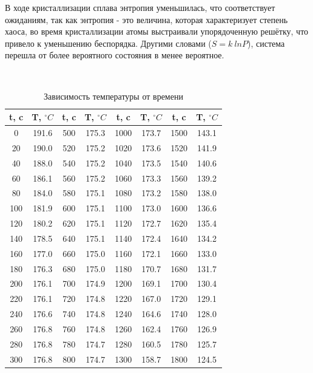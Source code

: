 \documentclass[a4paper]{scrartcl}
\begin{document}
В ходе кристаллизации сплава энтропия уменьшилась, что соответствует ожиданиям, так как энтропия - это величина, которая характеризует степень хаоса, во время кристаллизации атомы выстраивали упорядоченную решётку, что привело к уменьшению беспорядка. Другими словами ($S=k\:lnP$), система перешла от более вероятного состояния в менее вероятное.


\newpage
\setlength\doublerulesep{0.7pt}
\begin{table}[htb]
	\hypertarget{table}{}\\
	\caption{Зависимость температуры от времени}
	\begin{tabular}{c|c||c|c||c|c||c|c}
		t, c& T, $ ^\circ C $&t, c& T, $ ^\circ C $&t, c& T, $ ^\circ C $&t, c& T, $ ^\circ C $\\
		\hline\hline
		\cellcolor{yellow}0 & \cellcolor{yellow}191.6	&	500	&	175.3	&	1000	&	173.7	&	1500	&	143.1	\\
		20	&	190.0	&	520	&	175.2	&	1020	&	173.6	&	1520	&	141.9	\\
		40	&	188.0	&	540	&	175.2	&	1040	&	173.5	&	1540	&	140.6	\\
		60	&	186.1	&	560	&	175.2	&	1060	&	173.3	&	1560	&	139.2	\\
		80	&	184.0	&	580	&	175.1	&	1080	&	173.2	&	1580	&	138.0	\\
		100	&	181.9	&	600	&	175.1	&	1100	&	173.0	&	1600	&	136.6	\\
		120	&	180.2	&	620	&	175.1	&	1120	&	172.7	&	1620	&	135.4	\\
		140	&	178.5	&	640	&	175.1	&	1140	&	172.4	&	1640	&	134.2	\\
		160	&	177.0	&	660	&	175.0	&	\cellcolor{yellow}1160&	\cellcolor{yellow}172.1	&	1660	&	133.0	\\
		180	&	176.3	&	680	&	175.0	&	1180	&	170.7	&	1680	&	131.7	\\
		\cellcolor{yellow}200&	\cellcolor{yellow}176.1	&	700	&	174.9	&	1200	&	169.1	&	1700	&	130.4	\\
		220	&	176.1	&	720	&	174.8	&	1220	&	167.0	&	1720	&	129.1	\\
		240	&	176.6	&	740	&	174.8	&	1240	&	164.6	&	1740	&	128.0	\\
		260	&	176.8	&	760	&	174.8	&	1260	&	162.4	&	1760	&	126.9	\\
		280	&	176.8	&	780	&	174.7	&	1280	&	160.5	&	1780	&	125.7	\\
		300	&	176.8	&	800	&	174.7	&	1300	&	158.7	&	1800	&	124.5	\\

\end{tabular}
\end{table}
\end{document}
